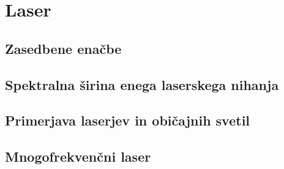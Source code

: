 \documentclass[11pt,fleqn]{book} %
\begin{document}











\afterpage{\null\newpage}




%
\chapter{Laser}
\section{Zasedbene enačbe}
\section{Spektralna širina enega laserskega nihanja}
\section{Primerjava laserjev in običajnih svetil}
\section{Mnogofrekvenčni laser}
\end{document}
